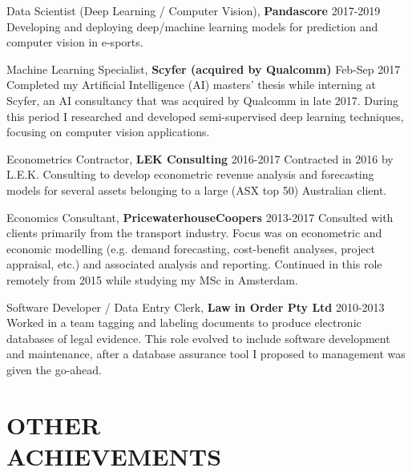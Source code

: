 \documentclass[margin]{res}
\begin{document}
\begin{resume}
		{Data Scientist (Deep Learning / Computer Vision),} {\bf Pandascore} \hfill 2017-2019
		\vspace{1mm}\newline
		Developing and deploying deep/machine learning models for prediction and computer vision in e-sports.
		\vspace{1.5mm}
		
		{Machine Learning Specialist,} {\bf Scyfer (acquired by Qualcomm)} \hfill Feb-Sep 2017\vspace{1mm}\newline
		Completed my Artificial Intelligence (AI) masters' thesis while interning at Scyfer, an AI consultancy that was acquired by Qualcomm in late 2017. During this period I researched and developed semi-supervised deep learning techniques, focusing on computer vision applications.
		\vspace{1.5mm}
		
		{Econometrics Contractor,} {\bf LEK Consulting} \hfill 2016-2017\vspace{1mm}\newline
		Contracted in 2016 by L.E.K. Consulting to develop econometric revenue analysis and forecasting models for several assets belonging to a large (ASX top 50) Australian client.
		\vspace{1.5mm}
		
		{Economics Consultant,} {\bf PricewaterhouseCoopers} \hfill 2013-2017\vspace{1mm}\newline
		Consulted with clients primarily from the transport industry. Focus was on econometric and economic modelling (e.g. demand forecasting, cost-benefit analyses, project appraisal, etc.) and associated analysis and reporting. Continued in this role remotely from 2015 while studying my MSc in Amsterdam.
		\vspace{1.5mm}
		
		{Software Developer / Data Entry Clerk,} {\bf Law in Order Pty Ltd} \hfill 2010-2013\vspace{1mm}\newline
		Worked in a team tagging and labeling documents to produce electronic databases of legal evidence. This role evolved to include software development and maintenance, after a database assurance tool I proposed to management was given the go-ahead.
		
		\newpage
		
		\section{OTHER \\ ACHIEVEMENTS}
		

\end{resume}
\end{document}
